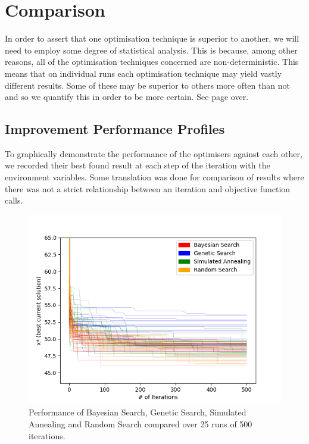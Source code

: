 \section{Comparison}
	\label{sec:comparison}
	In order to assert that one optimisation technique is superior to another, we will need to employ some degree of statistical analysis. This is because, among other reasons, all of the optimisation techniques concerned are non-deterministic. This means that on individual runs each optimisation technique may yield vastly different results. Some of these may be superior to others more often than not and so we quantify this in order to be more certain. See page over.
	\subsection{Improvement Performance Profiles}
		\label{sec:comparison_improvement_profile} 
		To graphically demonstrate the performance of the optimisers against each other, we recorded their best found result at each step of the iteration with the environment variables. Some translation was done for comparison of results where there was not a strict relationship between an iteration and objective function calls.
		\begin{figure}[H]
		\centering
		\includegraphics[scale=0.75]{graphics/performance}
		\caption{Performance of Bayesian Search, Genetic Search, Simulated Annealing and Random Search compared over 25 runs of 500 iterations.}
		\end{figure}
